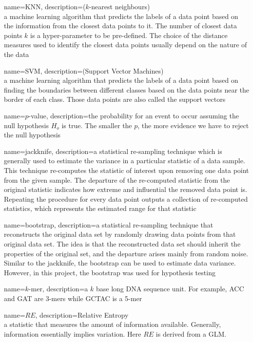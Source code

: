 {
        name=KNN,
        description={($k$-nearest neighbours) \\ a machine learning algorithm that predicts the labels of a data point based on the information from the closest data points to it. The number of closest data points $k$ is a hyper-parameter to be pre-defined. The choice of the distance measures used to identify the closest data points usually depend on the nature of the data}
}

{
        name=SVM,
        description={(Support Vector Machines) \\ a machine learning algorithm that predicts the labels of a data point based on finding the boundaries between different classes based on the data points near the border of each class. Those data points are also called the support vectors}
}

{
        name=$p$-value,
        description={the probability for an event to occur assuming the null hypothesis $H_o$ is true. The smaller the $p$, the more evidence we have to reject the null hypothesis}
}

{
        name=jackknife,
        description={a statistical re-sampling technique which is generally used to estimate the variance in a particular statistic of a data sample. This technique re-computes the statistic of interest upon removing one data point from the given sample. The departure of the re-computed statistic from the original statistic indicates how extreme and influential the removed data point is. Repeating the procedure for every data point outputs a collection of re-computed statistics, which represents the estimated range for that statistic}
}

{
        name=bootstrap,
        description={a statistical re-sampling technique that reconstructs the original data set by randomly drawing data points from that original data set. The idea is that the reconstructed data set should inherit the properties of the original set, and the departure arises mainly from random noise. Similar to the jackknife, the bootstrap can be used to estimate data variance. However, in this project, the bootstrap was used for hypothesis testing}
}

{
        name=$k$-mer,
        description={a $k$ base long DNA sequence unit. For example, ACC and GAT are 3-mers while GCTAC is a 5-mer}
}

{
        name=$RE$,
        description={Relative Entropy \\
        a statistic that measures the amount of information available. Generally, information essentially implies variation. Here $RE$ is derived from a GLM.}
}

